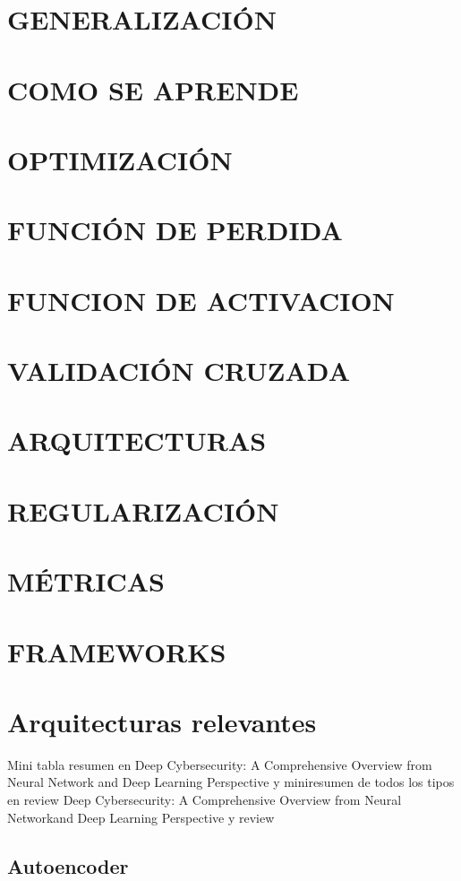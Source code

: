 \section{GENERALIZACIÓN}
\section{COMO SE APRENDE}
\section{OPTIMIZACIÓN}
\section{FUNCIÓN DE PERDIDA}
\section{FUNCION DE ACTIVACION}
\section{VALIDACIÓN CRUZADA}
\section{ARQUITECTURAS}
\section{REGULARIZACIÓN}
\section{MÉTRICAS}
\section{FRAMEWORKS}






\section{Arquitecturas relevantes} \label{Subsec: 3_2}
Mini tabla resumen en Deep Cybersecurity: A Comprehensive Overview from Neural Network and Deep Learning Perspective y miniresumen de todos los tipos en review Deep Cybersecurity: A Comprehensive Overview from Neural Networkand Deep Learning Perspective y review

\subsection{Autoencoder}

